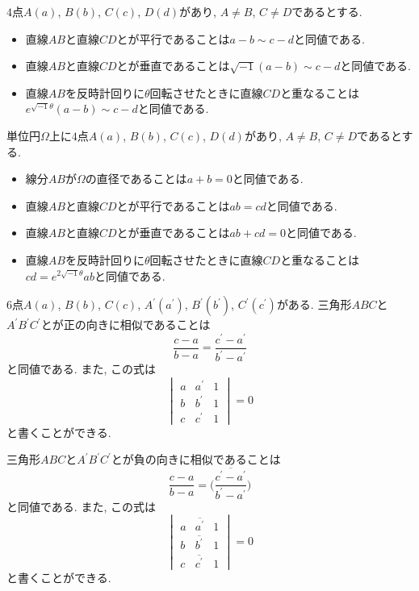 \begin{bthm}\label{thm:fund1}
$4$点$A(a)$, $B(b)$, $C(c)$, $D(d)$があり, $A\neq B$, $C\neq D$であるとする.
\begin{itemize}
\item 直線$AB$と直線$CD$とが平行であることは$a-b\sim c-d$と同値である.
\item 直線$AB$と直線$CD$とが垂直であることは$\sqrt{-1}(a-b)\sim c-d$と同値である.
\item 直線$AB$を反時計回りに$\theta$回転させたときに直線$CD$と重なることは$e^{\sqrt{-1}\theta}(a-b)\sim c-d$と同値である.
\end{itemize}
\end{bthm}
%
%
\begin{bthm}
単位円$\Omega$上に$4$点$A(a)$, $B(b)$, $C(c)$, $D(d)$があり, $A\neq B$, $C\neq D$であるとする.
\begin{itemize}
\item 線分$AB$が$\Omega$の直径であることは$a+b=0$と同値である.
\item 直線$AB$と直線$CD$とが平行であることは$ab=cd$と同値である.
\item 直線$AB$と直線$CD$とが垂直であることは$ab+cd=0$と同値である.
\item 直線$AB$を反時計回りに$\theta$回転させたときに直線$CD$と重なることは$cd=e^{2\sqrt{-1}\theta}ab$と同値である.
\end{itemize}
\end{bthm}
%
%
\begin{bthm}
$6$点$A(a)$, $B(b)$, $C(c)$, $A^\prime(a^\prime)$, $B^\prime(b^\prime)$, $C^\prime(c^\prime)$がある.
三角形$ABC$と$A^\prime B^\prime C^\prime$とが正の向きに相似であることは
\[\frac{c-a}{b-a}=\frac{c^\prime-a^\prime}{b^\prime-a^\prime}\]
と同値である.
また, この式は
\[\begin{vmatrix}a&a^\prime&1\\b&b^\prime&1\\c&c^\prime&1\end{vmatrix}=0\]
と書くことができる.

三角形$ABC$と$A^\prime B^\prime C^\prime$とが負の向きに相似であることは
\[\frac{c-a}{b-a}=\overline{\biggl(\frac{c^\prime-a^\prime}{b^\prime-a^\prime}\biggr)}\]
と同値である.
また, この式は
\[\begin{vmatrix}a&\overline{a^\prime}&1\\b&\overline{b^\prime}&1\\c&\overline{c^\prime}&1\end{vmatrix}=0\]
と書くことができる.
\end{bthm}
